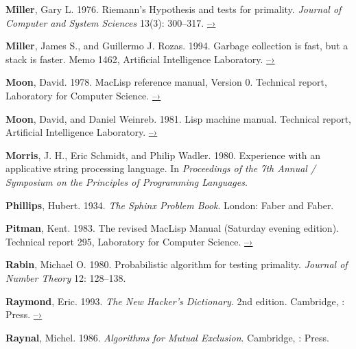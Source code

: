 \label{Miller 1976}
\textbf{Miller}, Gary L.  1976.  Riemann’s Hypothesis and tests for primality.
\textit{Journal of Computer and System Sciences} 13(3): 300--317.
\href{http://www.cs.cmu.edu/~glmiller/Publications/b2hd-Mi76.html}{–›}

 \label{Miller and Rozas 1994}
\textbf{Miller}, James S., and Guillermo J. Rozas. 1994.  Garbage collection is fast,
but a stack is faster.  Memo 1462,  Artificial Intelligence
Laboratory.
\href{http://dspace.mit.edu/handle/1721.1/6622}{–›}

 \label{Moon 1978}
\textbf{Moon}, David.  1978.  MacLisp reference manual, Version 0.  Technical report,
 Laboratory for Computer Science.
\href{http://www.softwarepreservation.org/projects/LISP/MIT/Moon-MACLISP_Reference_Manual-Apr_08_1974.pdf/view}{–›}

 \label{Moon and Weinreb 1981}
\textbf{Moon}, David, and Daniel Weinreb.  1981.  Lisp machine manual.  Technical
report,  Artificial Intelligence Laboratory.
\href{http://www.unlambda.com/lmman/index.html}{–›}

\enlargethispage{\baselineskip}

 \label{Morris et al. 1980}
\textbf{Morris}, J. H., Eric Schmidt, and Philip Wadler.  1980.  Experience with an
applicative string processing language.  In \textit{Proceedings of the 7th Annual
 / Symposium on the Principles of
Programming Languages}.

 \label{Phillips 1934}
\textbf{Phillips}, Hubert.  1934. \textit{The Sphinx Problem Book}.  London: Faber and
Faber.

 \label{Pitman 1983}
\textbf{Pitman}, Kent. 1983. The revised MacLisp Manual (Saturday evening edition).
Technical report 295,  Laboratory for Computer Science.
\href{http://maclisp.info/pitmanual}{–›}

 \label{Rabin 1980}
\textbf{Rabin}, Michael O. 1980. Probabilistic algorithm for testing primality.
\textit{Journal of Number Theory} 12: 128--138.

 \label{Raymond 1993}
\textbf{Raymond}, Eric.  1993. \textit{The New Hacker’s Dictionary}. 2nd edition.
Cambridge, :  Press.
\href{http://www.catb.org/jargon/}{–›}

\textbf{Raynal}, Michel. 1986. \textit{Algorithms for Mutual Exclusion}.  Cambridge, :
 Press.

